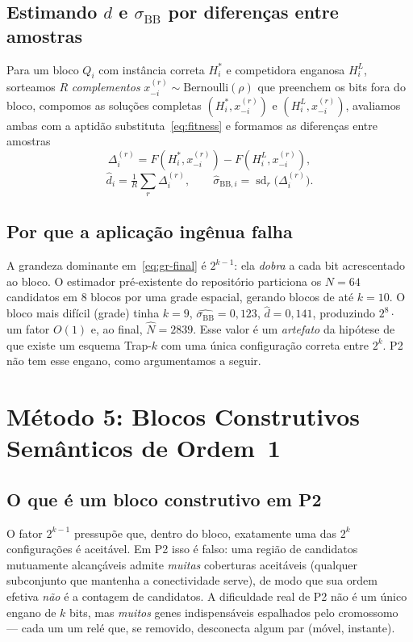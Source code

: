 \documentclass[conference]{IEEEtran}
\newcommand{\Nhat}{\hat{N}}
\newcommand{\sBB}{\sigma_{\mathrm{BB}}}
\begin{document}
\subsection{Estimando $d$ e $\sBB$ por diferenças entre amostras}
Para um bloco $Q_i$ com instância correta $H_i^*$ e competidora enganosa $H_i^L$,
sorteamos $R$ \emph{complementos} $x_{-i}^{(r)}\sim\text{Bernoulli}(\rho)$ que
preenchem os bits fora do bloco, compomos as soluções completas
$(H_i^*,x_{-i}^{(r)})$ e $(H_i^L,x_{-i}^{(r)})$, avaliamos ambas com a aptidão
substituta~\eqref{eq:fitness} e formamos as diferenças entre amostras
\begin{equation}
\Delta_i^{(r)} = F(H_i^*,x_{-i}^{(r)}) - F(H_i^L,x_{-i}^{(r)}),
\label{eq:delta}
\end{equation}
\begin{equation}
\widehat{d}_i = \tfrac1R\textstyle\sum_r \Delta_i^{(r)},
\qquad
\widehat{\sigma}_{\mathrm{BB},i} = \operatorname{sd}_r\!\big(\Delta_i^{(r)}\big).
\label{eq:dsigma}
\end{equation}

\subsection{Por que a aplicação ingênua falha}
A grandeza dominante em~\eqref{eq:gr-final} é $2^{k-1}$: ela \emph{dobra} a cada bit
acrescentado ao bloco. O estimador pré-existente do repositório particiona os
$N=64$ candidatos em $8$ blocos por uma grade espacial, gerando blocos de até
$k=10$. O bloco mais difícil (grade) tinha $k=9$, $\widehat{\sBB}=0{,}123$,
$\widehat{d}=0{,}141$, produzindo $2^{8}\cdot$ um fator $O(1)$ e, ao final,
$\Nhat=2839$. Esse valor é um \emph{artefato} da hipótese de que existe um esquema
Trap-$k$ com uma única configuração correta entre $2^k$. P2 não tem esse engano,
como argumentamos a seguir.

\section{Método 5: Blocos Construtivos Semânticos de Ordem~1}
\label{sec:m5}
\subsection{O que é um bloco construtivo em P2}
O fator $2^{k-1}$ pressupõe que, dentro do bloco, exatamente uma das $2^{k}$
configurações é aceitável. Em P2 isso é falso: uma região de candidatos
mutuamente alcançáveis admite \emph{muitas} coberturas aceitáveis (qualquer
subconjunto que mantenha a conectividade serve), de modo que sua ordem efetiva
\emph{não} é a contagem de candidatos. A dificuldade real de P2 não é um único
engano de $k$ bits, mas \emph{muitos} genes indispensáveis espalhados pelo
cromossomo --- cada um um relé que, se removido, desconecta algum par
(móvel, instante).
\end{document}
